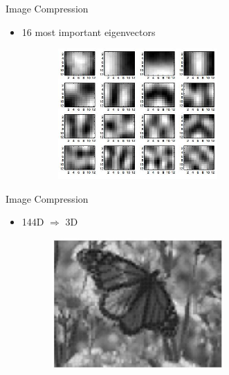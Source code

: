 \documentclass[serif, aspectratio=169]{beamer}
\begin{document}
\begin{frame}{Image Compression}
       \begin{itemize}
           \item 16 most important eigenvectors
       \end{itemize}
        \begin{figure}[htpb]
            \begin{center}
                \includegraphics[width=8cm, height=5cm]{pic/16_most.JPG}
            \end{center}
        \end{figure}
\end{frame}


\begin{frame}{Image Compression}
       \begin{itemize}
           \item 144D $\Rightarrow$ 3D
       \end{itemize}
        \begin{figure}[htpb]
            \begin{center}
                \includegraphics[width=8cm, height=5cm]{pic/3d.JPG}
            \end{center}
        \end{figure}
\end{frame}
\end{document}
